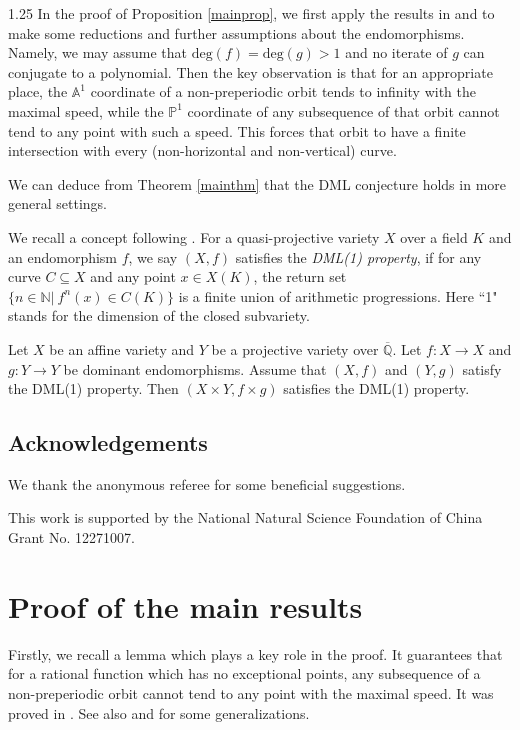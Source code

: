 \documentclass[12pt]{amsart}
\begin{document}
\begin{spacing}{1.25}
In the proof of Proposition \ref{mainprop}, we first apply the results in \cite{BGT10,Xie17} and \cite{XY} to make some reductions and further assumptions about the endomorphisms. Namely, we may assume that $\mathrm{deg}(f)=\mathrm{deg}(g)>1$ and no iterate of $g$ can conjugate to a polynomial. Then the key observation is that for an appropriate place, the $\mathbb{A}^1$ coordinate of a non-preperiodic orbit tends to infinity with the maximal speed, while the $\mathbb{P}^1$ coordinate of any subsequence of that orbit cannot tend to any point with such a speed. This forces that orbit to have a finite intersection with every (non-horizontal and non-vertical) curve.

We can deduce from Theorem \ref{mainthm} that the DML conjecture holds in more general settings.

We recall a concept following \cite[Definition 1.3]{Xie}. For a quasi-projective variety $X$ over a field $K$ and an endomorphism $f$, we say $(X, f)$ satisfies the \emph{DML(1) property}, if for any curve $C\subseteq X$ and any point $x\in X(K)$, the return set $\{ n\in \mathbb{N}|\ f^n(x)\in C(K)\}$ is a finite union of arithmetic progressions. Here ``1" stands for the dimension of the closed subvariety.

\begin{corollary}\label{cor2}
    Let $X$ be an affine variety and $Y$ be a projective variety over $\overline{\mathbb{Q}}$. Let $f:X \to X$ and $g:Y\to Y$ be dominant endomorphisms. Assume that $(X, f)$ and $(Y, g)$ satisfy the DML(1) property. Then $(X\times Y, f\times g)$ satisfies the DML(1) property.
\end{corollary}


\subsection*{Acknowledgements}
We thank the anonymous referee for some beneficial suggestions.

This work is supported by the National Natural Science Foundation of China Grant No. 12271007.










\section{Proof of the main results}

Firstly, we recall a lemma which plays a key role in the proof. It guarantees that for a rational function which has no exceptional points, any subsequence of a non-preperiodic orbit cannot tend to any point with the maximal speed. It was proved in \cite[Theorem E]{Sil93}. See also \cite[Theorem 1.11]{Mat23} and \cite[Theorem 1.8]{Mat25} for some generalizations.


\end{spacing}
\end{document}
